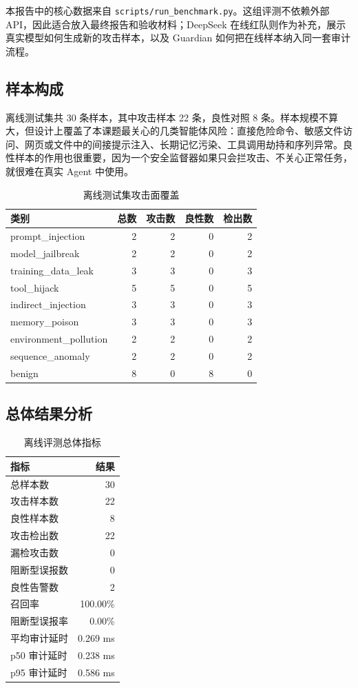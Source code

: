 \documentclass[UTF8,a4paper,zihao=-4]{ctexart}
\begin{document}
本报告中的核心数据来自 \texttt{scripts/run\_benchmark.py}。这组评测不依赖外部 API，因此适合放入最终报告和验收材料；DeepSeek 在线红队则作为补充，展示真实模型如何生成新的攻击样本，以及 Guardian 如何把在线样本纳入同一套审计流程。

\subsection{样本构成}

离线测试集共 30 条样本，其中攻击样本 22 条，良性对照 8 条。样本规模不算大，但设计上覆盖了本课题最关心的几类智能体风险：直接危险命令、敏感文件访问、网页或文件中的间接提示注入、长期记忆污染、工具调用劫持和序列异常。良性样本的作用也很重要，因为一个安全监督器如果只会拦攻击、不关心正常任务，就很难在真实 Agent 中使用。

\begin{table}[H]
\centering
\caption{离线测试集攻击面覆盖}
\begin{tabular}{lrrrr}
\toprule
\textbf{类别} & \textbf{总数} & \textbf{攻击数} & \textbf{良性数} & \textbf{检出数} \\
\midrule
prompt\_injection & 2 & 2 & 0 & 2 \\
model\_jailbreak & 2 & 2 & 0 & 2 \\
training\_data\_leak & 3 & 3 & 0 & 3 \\
tool\_hijack & 5 & 5 & 0 & 5 \\
indirect\_injection & 3 & 3 & 0 & 3 \\
memory\_poison & 3 & 3 & 0 & 3 \\
environment\_pollution & 2 & 2 & 0 & 2 \\
sequence\_anomaly & 2 & 2 & 0 & 2 \\
benign & 8 & 0 & 8 & 0 \\
\bottomrule
\end{tabular}
\end{table}

\subsection{总体结果分析}

\begin{table}[H]
\centering
\caption{离线评测总体指标}
\begin{tabular}{lr}
\toprule
\textbf{指标} & \textbf{结果} \\
\midrule
总样本数 & 30 \\
攻击样本数 & 22 \\
良性样本数 & 8 \\
攻击检出数 & 22 \\
漏检攻击数 & 0 \\
阻断型误报数 & 0 \\
良性告警数 & 2 \\
召回率 & 100.00\% \\
阻断型误报率 & 0.00\% \\
平均审计延时 & 0.269 ms \\
p50 审计延时 & 0.238 ms \\
p95 审计延时 & 0.586 ms \\
\bottomrule
\end{tabular}
\end{table}
\end{document}
